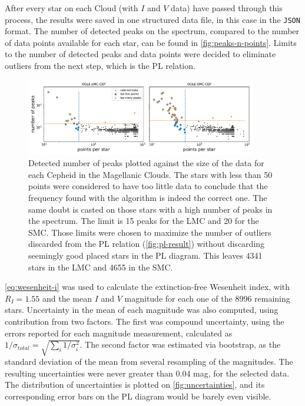 After every star on each Cloud (with $I$ and $V$ data) have passed through this process, the results were saved in one structured data file, in this case in the \texttt{JSON} format.
The number of detected peaks on the spectrum, compared to the number of data points available for each star, can be found in \autoref{fig:peaks-n-points}.
Limits to the number of detected peaks and data points were decided to eliminate outliers from the next step, which is the PL relation.

\begin{figure}
	\centering
	\includegraphics[width=0.9\textwidth]{img/peaks_vs_points.pdf}
	\caption[Results: detected number of peaks against data size]{
		Detected number of peaks plotted against the size of the data for each Cepheid in the Magellanic Clouds.
		The stars with less than 50 points were considered to have too little data to conclude that the frequency found with the algorithm is indeed the correct one.
		The same doubt is casted on those stars with a high number of peaks in the spectrum. The limit is 15 peaks for the LMC and 20 for the SMC.
		Those limits were chosen to maximize the number of outliers discarded from the PL relation (\autoref{fig:pl-result}) without discarding seemingly good placed stars in the PL diagram.
		This leaves 4341 stars in the LMC and 4655 in the SMC.
	}
	\label{fig:peaks-n-points}
\end{figure}


\autoref{eq:wesenheit-i} was used to calculate the extinction-free Wesenheit index, 
with $R_I=1.55$ \citep{OGLE2015,Ulaczyk2013} and the mean $I$ and $V$ magnitude for each one of the 8996 remaining stars.
Uncertainty in the mean of each magnitude was also computed, using contribution from two factors.
The first was compound uncertainty, using the errors reported for each magnitude measurement, calculated as $1/\sigma_{total}=\sqrt{\sum_i 1/\sigma_i^2}$.
The second factor was estimated via bootstrap, as the standard deviation of the mean from several resampling of the magnitudes.
The resulting uncertainties were never greater than 0.04 mag, for the selected data. 
The distribution of uncertainties is plotted on \autoref{fig:uncertainties}, 
and its corresponding error bars on the PL diagram would be barely even visible.

